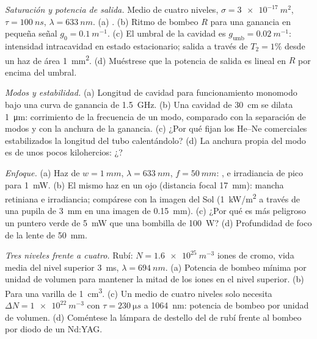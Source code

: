 \begin{exercise}[$\star\star$]\label{exo:b2:laser:6}
\emph{Saturación y potencia de salida.} Medio de cuatro niveles, $\sigma =
\qty{3e-17}{m^2}$, $\tau = \qty{100}{ns}$, $\lambda = \qty{633}{nm}$.
(a) . (b) Ritmo de bombeo $R$ para una ganancia en pequeña señal
$g_0 = \qty{0.1}{m^{-1}}$. (c) El umbral de la cavidad es
$g_{\text{umb}} = \qty{0.02}{m^{-1}}$: intensidad intracavidad en estado
estacionario; salida a través de $T_2 = 1\%$ desde un haz de área \qty{1}{mm^2}.
(d) Muéstrese que la potencia de salida es lineal en $R$ por encima del umbral.
\end{exercise}

\begin{exercise}[$\star\star$]\label{exo:b2:laser:7}
\emph{Modos y estabilidad.} (a) Longitud de cavidad para funcionamiento monomodo
bajo una curva de ganancia de \qty{1.5}{GHz}. (b) Una cavidad de \qty{30}{cm} se dilata
\qty{1}{\micro m}: corrimiento de la frecuencia de un modo, comparado con la
separación de modos y con la anchura de la ganancia. (c) ¿Por qué fijan los He--Ne
comerciales estabilizados la longitud del tubo calentándolo? (d) La anchura propia del modo es
de unos pocos kilohercios: ¿?
\end{exercise}

\begin{exercise}[$\star\star$]\label{exo:b2:laser:8}
\emph{Enfoque.} (a) Haz de $w = \qty{1}{mm}$, $\lambda = \qty{633}{nm}$,
$f = \qty{50}{mm}$: ,  e irradiancia de pico para
\qty{1}{mW}. (b) El mismo haz en un ojo (distancia focal \qty{17}{mm}):
mancha retiniana e irradiancia; compárese con la imagen del Sol
(\qty{1}{kW/m^2} a través de una pupila de \qty{3}{mm} en una imagen de \qty{0.15}{mm}).
(c) ¿Por qué es más peligroso un puntero verde de \qty{5}{mW} que una
bombilla de \qty{100}{W}? (d) Profundidad de foco de la lente de \qty{50}{mm}.
\end{exercise}

\begin{exercise}[$\star\star$]\label{exo:b2:laser:9}
\emph{Tres niveles frente a cuatro.} Rubí: $N = \qty{1.6e25}{m^{-3}}$
iones de cromo, vida media del nivel superior \qty{3}{ms}, $\lambda =
\qty{694}{nm}$. (a) Potencia de bombeo mínima por unidad de volumen para mantener la mitad de los
iones en el nivel superior. (b) Para una varilla de \qty{1}{cm^3}. (c) Un medio de cuatro
niveles solo necesita $\Delta N = \qty{1e22}{m^{-3}}$ con $\tau =
\qty{230}{\micro s}$ a \qty{1064}{nm}: potencia de bombeo por unidad de volumen. (d) Coméntese
la lámpara de destello del  de rubí frente al bombeo por diodo de un Nd:YAG.
\end{exercise}

